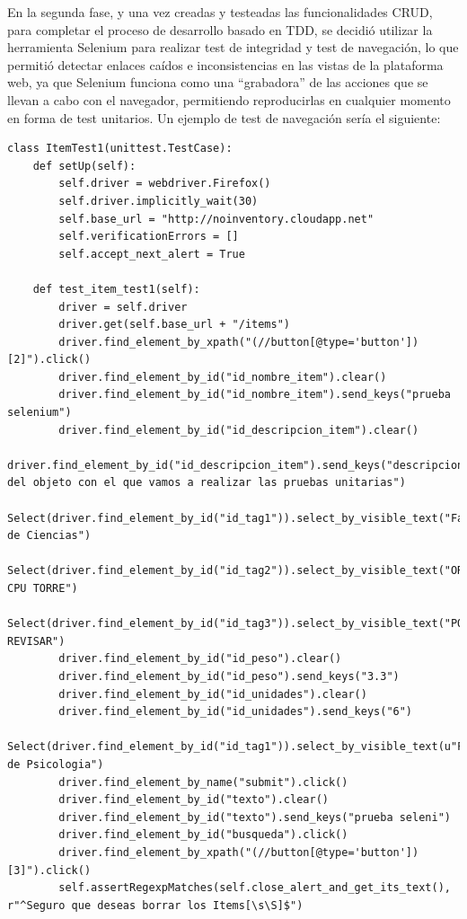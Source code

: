 \documentclass[a4paper,11pt]{book}
\begin{document}
En la segunda fase, y una vez creadas y testeadas las funcionalidades CRUD, para completar el proceso de desarrollo basado en TDD,  se decidió utilizar la herramienta Selenium\cite{sele} para realizar test de integridad y test de navegación, lo que permitió detectar enlaces caídos e inconsistencias en las vistas de la plataforma web, ya que Selenium funciona como una “grabadora” de las acciones que se llevan a cabo con el navegador, permitiendo reproducirlas en cualquier momento en forma de test unitarios. Un ejemplo de test de navegación sería el siguiente:
\begin{lstlisting}
class ItemTest1(unittest.TestCase):
    def setUp(self):
        self.driver = webdriver.Firefox()
        self.driver.implicitly_wait(30)
        self.base_url = "http://noinventory.cloudapp.net"
        self.verificationErrors = []
        self.accept_next_alert = True

    def test_item_test1(self):
        driver = self.driver
        driver.get(self.base_url + "/items")
        driver.find_element_by_xpath("(//button[@type='button'])[2]").click()
        driver.find_element_by_id("id_nombre_item").clear()
        driver.find_element_by_id("id_nombre_item").send_keys("prueba selenium")
        driver.find_element_by_id("id_descripcion_item").clear()
        driver.find_element_by_id("id_descripcion_item").send_keys("descripcion del objeto con el que vamos a realizar las pruebas unitarias")
        Select(driver.find_element_by_id("id_tag1")).select_by_visible_text("Facultad de Ciencias")
        Select(driver.find_element_by_id("id_tag2")).select_by_visible_text("ORDENADOR CPU TORRE")
        Select(driver.find_element_by_id("id_tag3")).select_by_visible_text("POR REVISAR")
        driver.find_element_by_id("id_peso").clear()
        driver.find_element_by_id("id_peso").send_keys("3.3")
        driver.find_element_by_id("id_unidades").clear()
        driver.find_element_by_id("id_unidades").send_keys("6")
        Select(driver.find_element_by_id("id_tag1")).select_by_visible_text(u"Facultad de Psicologia")
        driver.find_element_by_name("submit").click()
        driver.find_element_by_id("texto").clear()
        driver.find_element_by_id("texto").send_keys("prueba seleni")
        driver.find_element_by_id("busqueda").click()
        driver.find_element_by_xpath("(//button[@type='button'])[3]").click()
        self.assertRegexpMatches(self.close_alert_and_get_its_text(), r"^Seguro que deseas borrar los Items[\s\S]$")

\end{lstlisting}
\end{document}
